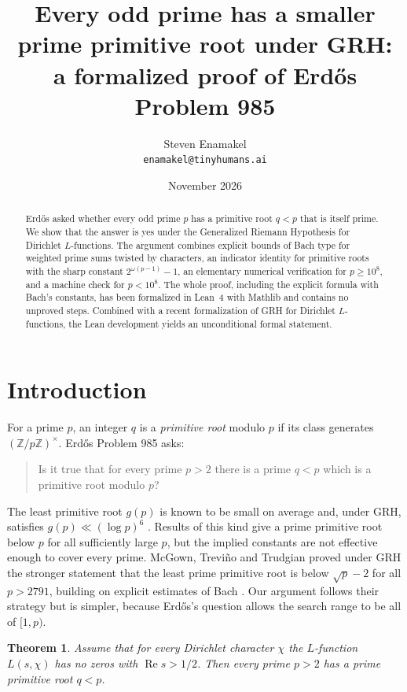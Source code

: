 \documentclass[11pt]{amsart}
\title[Prime primitive roots under GRH]{Every odd prime has a smaller prime primitive root under GRH:\\ a formalized proof of Erd\H{o}s Problem 985}
\author[Steven Enamakel]{Steven Enamakel\\[2pt] {\normalfont\small\texttt{\lowercase{enamakel@tinyhumans.ai}}}}
\date{November 2026}
\newtheorem{theorem}{Theorem}
\theoremstyle{definition}
\theoremstyle{remark}
\renewcommand{\Re}{\operatorname{Re}}
\begin{document}
\begin{abstract}
Erd\H{o}s asked whether every odd prime $p$ has a primitive root $q<p$ that is itself prime. We show that the answer is yes under the Generalized Riemann Hypothesis for Dirichlet $L$-functions. The argument combines explicit bounds of Bach type for weighted prime sums twisted by characters, an indicator identity for primitive roots with the sharp constant $2^{\omega(p-1)}-1$, an elementary numerical verification for $p\ge 10^8$, and a machine check for $p<10^8$. The whole proof, including the explicit formula with Bach's constants, has been formalized in Lean~4 with Mathlib and contains no unproved steps. Combined with a recent formalization of GRH for Dirichlet $L$-functions, the Lean development yields an unconditional formal statement.
\end{abstract}
\maketitle

\section{Introduction}

For a prime $p$, an integer $q$ is a \emph{primitive root} modulo $p$ if its class generates $(\mathbb{Z}/p\mathbb{Z})^\times$. Erd\H{o}s Problem 985 \cite{erdosproblems} asks:

\begin{quote}
Is it true that for every prime $p>2$ there is a prime $q<p$ which is a primitive root modulo $p$?
\end{quote}

The least primitive root $g(p)$ is known to be small on average and, under GRH, satisfies $g(p)\ll (\log p)^6$ \cite{shoup}. Results of this kind give a prime primitive root below $p$ for all sufficiently large $p$, but the implied constants are not effective enough to cover every prime. McGown, Trevi\~no and Trudgian \cite{mtt} proved under GRH the stronger statement that the least prime primitive root is below $\sqrt p-2$ for all $p>2791$, building on explicit estimates of Bach \cite{bach97}. Our argument follows their strategy but is simpler, because Erd\H{o}s's question allows the search range to be all of $[1,p)$.

\begin{theorem}\label{thm:main}
Assume that for every Dirichlet character $\chi$ the $L$-function $L(s,\chi)$ has no zeros with $\Re s>1/2$. Then every prime $p>2$ has a prime primitive root $q<p$.
\end{theorem}
\end{document}
